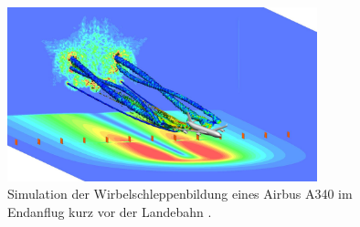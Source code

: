 \begin{figure}
\centering
\includegraphics[width=0.8\textwidth]{papers/wirbelringe/fig/wirbelschleppen_in_der_simulation.jpg}
\caption{Simulation der Wirbelschleppenbildung eines Airbus A340 im Endanflug kurz vor der Landebahn
\cite{Wirbelringe:wirbelschleppen_in_der_simulation}. \label{Wirbelringe:fig:wirbelschleppen_in_der_simulation}}
\end{figure}